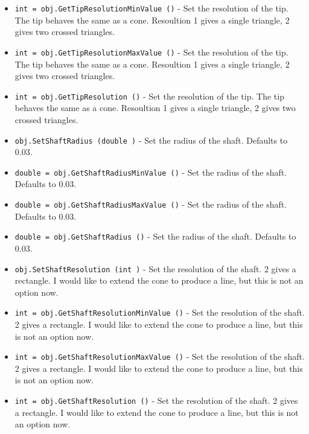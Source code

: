 \begin{itemize}
\item  \verb|int = obj.GetTipResolutionMinValue ()| -  Set the resolution of the tip.  The tip behaves the same as a cone.
 Resoultion 1 gives a single triangle, 2 gives two crossed triangles.

\item  \verb|int = obj.GetTipResolutionMaxValue ()| -  Set the resolution of the tip.  The tip behaves the same as a cone.
 Resoultion 1 gives a single triangle, 2 gives two crossed triangles.

\item  \verb|int = obj.GetTipResolution ()| -  Set the resolution of the tip.  The tip behaves the same as a cone.
 Resoultion 1 gives a single triangle, 2 gives two crossed triangles.

\item  \verb|obj.SetShaftRadius (double )| -  Set the radius of the shaft.  Defaults to 0.03.

\item  \verb|double = obj.GetShaftRadiusMinValue ()| -  Set the radius of the shaft.  Defaults to 0.03.

\item  \verb|double = obj.GetShaftRadiusMaxValue ()| -  Set the radius of the shaft.  Defaults to 0.03.

\item  \verb|double = obj.GetShaftRadius ()| -  Set the radius of the shaft.  Defaults to 0.03.

\item  \verb|obj.SetShaftResolution (int )| -  Set the resolution of the shaft.  2 gives a rectangle.
 I would like to extend the cone to produce a line,
 but this is not an option now.

\item  \verb|int = obj.GetShaftResolutionMinValue ()| -  Set the resolution of the shaft.  2 gives a rectangle.
 I would like to extend the cone to produce a line,
 but this is not an option now.

\item  \verb|int = obj.GetShaftResolutionMaxValue ()| -  Set the resolution of the shaft.  2 gives a rectangle.
 I would like to extend the cone to produce a line,
 but this is not an option now.

\item  \verb|int = obj.GetShaftResolution ()| -  Set the resolution of the shaft.  2 gives a rectangle.
 I would like to extend the cone to produce a line,
 but this is not an option now.


\end{itemize}
